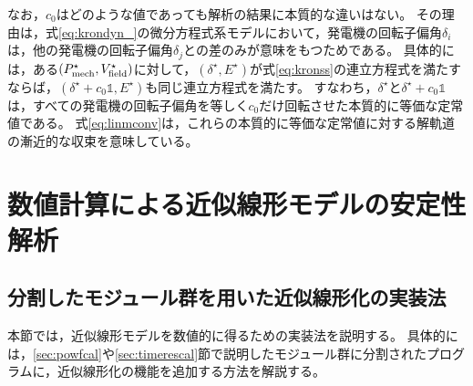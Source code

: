 \documentclass[tombow,dvipdfmx]{corona-a5-1.1}
\begin{document}
なお，$c_0$はどのような値であっても解析の結果に本質的な違いはない。
その理由は，式\ref{eq:krondyn_}の微分方程式系モデルにおいて，発電機の回転子偏角$\delta_i$は，他の発電機の回転子偏角$\delta_j$との差のみが意味をもつためである。
具体的には，ある$(P_{{\rm mech}}^{\star},V_{{\rm field}}^{\star})$に対して，$(\delta^{\star},E^{\star})$が式\ref{eq:kronss}の連立方程式を満たすならば，$(\delta^{\star}+c_0 \mathds{1},E^{\star})$も同じ連立方程式を満たす。
すなわち，$\delta^{\star}$と$\delta^{\star}+c_0 \mathds{1}$は，すべての発電機の回転子偏角を等しく$c_0$だけ回転させた本質的に等価な定常値である。
式\ref{eq:linmconv}は，これらの本質的に等価な定常値に対する解軌道の漸近的な収束を意味している。


\section{数値計算による近似線形モデルの安定性解析}\label{sec:numlinsta}

\subsection{分割したモジュール群を用いた近似線形化の実装法}

本節では，近似線形モデルを数値的に得るための実装法を説明する。
具体的には，\ref{sec:powfcal}や\ref{sec:timerescal}節で説明したモジュール群に分割されたプログラムに，近似線形化の機能を追加する方法を解説する。
\end{document}
